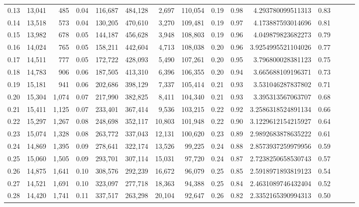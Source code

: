 \begin{tabular}{rrrrrrrrrrrrrrr}
0.13 &  13,041 &    485 &  0.04 &  116,687 &  484,128 &    2,697 &  110,054 &  0.19 &  0.98 &     4.293780099511313 &      0.83 \\
0.14 &  13,518 &    573 &  0.04 &  130,205 &  470,610 &    3,270 &  109,481 &  0.19 &  0.97 &     4.173887593014696 &      0.81 \\
0.15 &  13,982 &    678 &  0.05 &  144,187 &  456,628 &    3,948 &  108,803 &  0.19 &  0.96 &     4.049879823682273 &      0.79 \\
0.16 &  14,024 &    765 &  0.05 &  158,211 &  442,604 &    4,713 &  108,038 &  0.20 &  0.96 &    3.9254995521104026 &      0.77 \\
0.17 &  14,511 &    777 &  0.05 &  172,722 &  428,093 &    5,490 &  107,261 &  0.20 &  0.95 &     3.796800028381123 &      0.75 \\
0.18 &  14,783 &    906 &  0.06 &  187,505 &  413,310 &    6,396 &  106,355 &  0.20 &  0.94 &     3.665688109196371 &      0.73 \\
0.19 &  15,181 &    941 &  0.06 &  202,686 &  398,129 &    7,337 &  105,414 &  0.21 &  0.93 &     3.531046287837802 &      0.71 \\
0.20 &  15,304 &  1,074 &  0.07 &  217,990 &  382,825 &    8,411 &  104,340 &  0.21 &  0.93 &     3.395313567063707 &      0.68 \\
0.21 &  15,411 &  1,125 &  0.07 &  233,401 &  367,414 &    9,536 &  103,215 &  0.22 &  0.92 &    3.2586318524891134 &      0.66 \\
0.22 &  15,297 &  1,267 &  0.08 &  248,698 &  352,117 &   10,803 &  101,948 &  0.22 &  0.90 &    3.1229612154215927 &      0.64 \\
0.23 &  15,074 &  1,328 &  0.08 &  263,772 &  337,043 &   12,131 &  100,620 &  0.23 &  0.89 &    2.9892683878635222 &      0.61 \\
0.24 &  14,869 &  1,395 &  0.09 &  278,641 &  322,174 &   13,526 &   99,225 &  0.24 &  0.88 &    2.8573937259979956 &      0.59 \\
0.25 &  15,060 &  1,505 &  0.09 &  293,701 &  307,114 &   15,031 &   97,720 &  0.24 &  0.87 &    2.7238250658530743 &      0.57 \\
0.26 &  14,875 &  1,641 &  0.10 &  308,576 &  292,239 &   16,672 &   96,079 &  0.25 &  0.85 &    2.5918971893819123 &      0.54 \\
0.27 &  14,521 &  1,691 &  0.10 &  323,097 &  277,718 &   18,363 &   94,388 &  0.25 &  0.84 &    2.4631089746432404 &      0.52 \\
0.28 &  14,420 &  1,741 &  0.11 &  337,517 &  263,298 &   20,104 &   92,647 &  0.26 &  0.82 &    2.3352165390994313 &      0.50 \\

\end{tabular}
